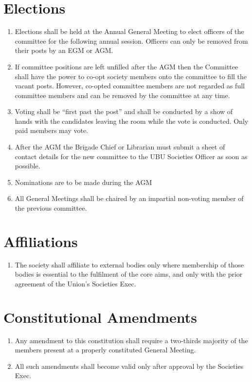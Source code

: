 \documentclass[a4paper,10pt]{article}
\begin{document}
\section{Elections}
\begin{enumerate}
  \item Elections shall be held at the Annual General Meeting to elect officers of the committee for the following annual session. Officers can only be removed from their posts by an EGM or AGM.
  \item If committee positions are left unfilled after the AGM then the Committee shall have the power to co-opt society members onto the committee to fill the vacant posts. However, co-opted committee members are not regarded as full committee members and can be removed by the committee at any time.
  \item Voting shall be “first past the post” and shall be conducted by a show of hands with the candidates leaving the room while the vote is conducted. Only paid members may vote.
  \item After the AGM the Brigade Chief or Librarian must submit a sheet of contact details for the new committee to the UBU Societies Officer as soon as possible.
  \item Nominations are to be made during the AGM
  \item All General Meetings shall be chaired by an impartial non-voting member of the previous committee.
\end{enumerate}

\section{Affiliations}
\begin{enumerate}
  \item The society shall affiliate to external bodies only where membership of those bodies is essential to the fulfilment of the core aims, and only with the prior agreement of the Union’s Societies Exec.
\end{enumerate}

\section{Constitutional Amendments}
\begin{enumerate}
  \item Any amendment to this constitution shall require a two-thirds majority of the members present at a properly constituted General Meeting.
  \item All such amendments shall become valid only after approval by the Societies Exec.
\end{enumerate}
\end{document}
